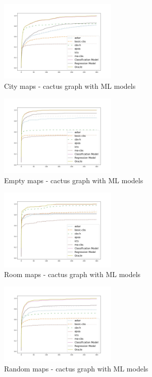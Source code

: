 \documentclass[letterpaper]{article} %
\begin{document}
\begin{figure}[h]
    \centering
    \includegraphics[width=0.5\textwidth]{images/city-cactus.jpg}
    \caption{City maps - cactus graph with ML models}
    \label{fig:3}
\end{figure}

\begin{figure}[h]
    \centering
    \includegraphics[width=0.5\textwidth]{images/empty-cactus.jpg}
    \caption{Empty maps - cactus graph with ML models}
    \label{fig:3}
\end{figure}

\begin{figure}[h]
    \centering
    \includegraphics[width=0.5\textwidth]{images/room-cactus.jpg}
    \caption{Room maps - cactus graph with ML models}
    \label{fig:3}
\end{figure}

\begin{figure}[h]
    \centering
    \includegraphics[width=0.5\textwidth]{images/random-cactus.jpg}
    \caption{Random maps - cactus graph with ML models}
    \label{fig:3}
\end{figure}
\end{document}
